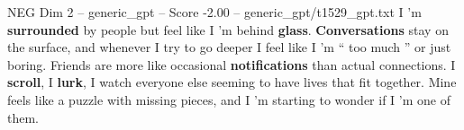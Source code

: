 \begin{textsample}{NEG Dim 2 – generic\_gpt – Score -2.00 – generic\_gpt/t1529\_gpt.txt}  \label{ex:f2_neg_008}
I ’m \textbf{surrounded} by people but feel like I ’m behind \textbf{glass}. \textbf{Conversations} stay on the surface, and whenever I try to go deeper I feel like I ’m “ too much ” or just boring.
Friends are more like occasional \textbf{notifications} than actual connections.
I \textbf{scroll}, I \textbf{lurk}, I watch everyone else seeming to have lives that fit together.
Mine feels like a puzzle with missing pieces, and I ’m starting to wonder if I ’m one of them.

\end{textsample}

